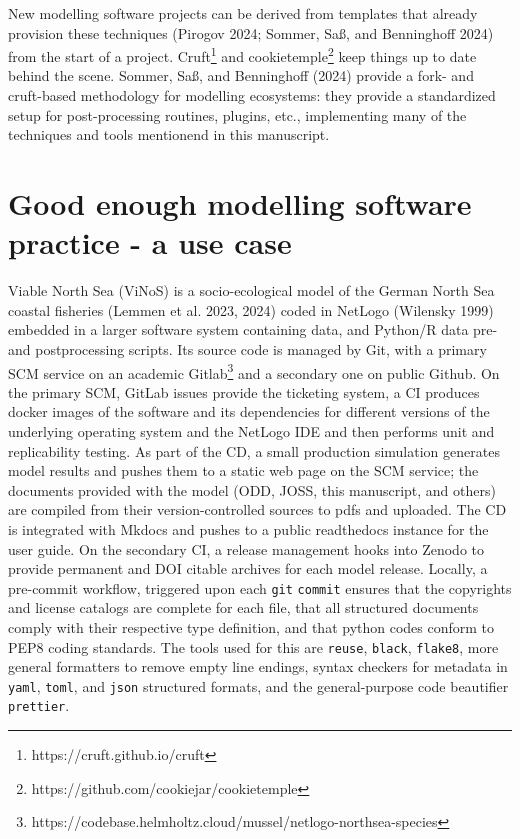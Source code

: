 \documentclass[preprint,11pt,5p]{elsarticle}
\begin{document}
New modelling software projects can be derived from templates that
already provision these techniques (Pirogov 2024; Sommer, Saß, and
Benninghoff 2024) from the start of a project. Cruft\footnote{https://cruft.github.io/cruft}
and cookietemple\footnote{https://github.com/cookiejar/cookietemple}
keep things up to date behind the scene. Sommer, Saß, and Benninghoff
(2024) provide a fork- and cruft-based methodology for modelling
ecosystems: they provide a standardized setup for post-processing
routines, plugins, etc., implementing many of the techniques and tools
mentionend in this manuscript.

\section{Good enough modelling software practice - a use
case}\label{good-enough-modelling-software-practice---a-use-case}

Viable North Sea (ViNoS) is a socio-ecological model of the German North
Sea coastal fisheries (Lemmen et al. 2023, 2024) coded in NetLogo
(Wilensky 1999) embedded in a larger software system containing data,
and Python/R data pre- and postprocessing scripts. Its source code is
managed by Git, with a primary SCM service on an academic
Gitlab\footnote{https://codebase.helmholtz.cloud/mussel/netlogo-northsea-species}
and a secondary one on public Github. On the primary SCM, GitLab issues
provide the ticketing system, a CI produces docker images of the
software and its dependencies for different versions of the underlying
operating system and the NetLogo IDE and then performs unit and
replicability testing. As part of the CD, a small production simulation
generates model results and pushes them to a static web page on the SCM
service; the documents provided with the model (ODD, JOSS, this
manuscript, and others) are compiled from their version-controlled
sources to pdfs and uploaded. The CD is integrated with Mkdocs and
pushes to a public readthedocs instance for the user guide. On the
secondary CI, a release management hooks into Zenodo to provide
permanent and DOI citable archives for each model release. Locally, a
pre-commit workflow, triggered upon each \texttt{git} \texttt{commit}
ensures that the copyrights and license catalogs are complete for each
file, that all structured documents comply with their respective type
definition, and that python codes conform to PEP8 coding standards. The
tools used for this are \texttt{reuse}, \texttt{black}, \texttt{flake8},
more general formatters to remove empty line endings, syntax checkers
for metadata in \texttt{yaml}, \texttt{toml}, and \texttt{json}
structured formats, and the general-purpose code beautifier
\texttt{prettier}.
\end{document}
